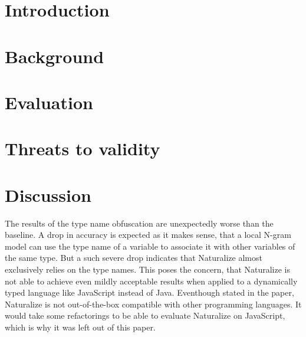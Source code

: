 \documentclass[sigconf]{acmart}
\begin{document}




\maketitle

\section{Introduction}


\section{Background}


\section{Evaluation}


\section{Threats to validity}

\section{Discussion}
The results of the type name obfuscation are unexpectedly worse than the baseline. A drop in accuracy is expected as it makes sense, that a local N-gram model can use the type name of a variable to associate it with other variables of the same type. But a such severe drop indicates that Naturalize almost exclusively relies on the type names. This poses the concern, that Naturalize is not able to achieve even mildly acceptable results when applied to a dynamically typed language like JavaScript instead of Java. Eventhough stated in the paper, Naturalize is not out-of-the-box compatible with other programming languages. It would take some refactorings to be able to evaluate Naturalize on JavaScript, which is why it was left out of this paper.
\end{document}

